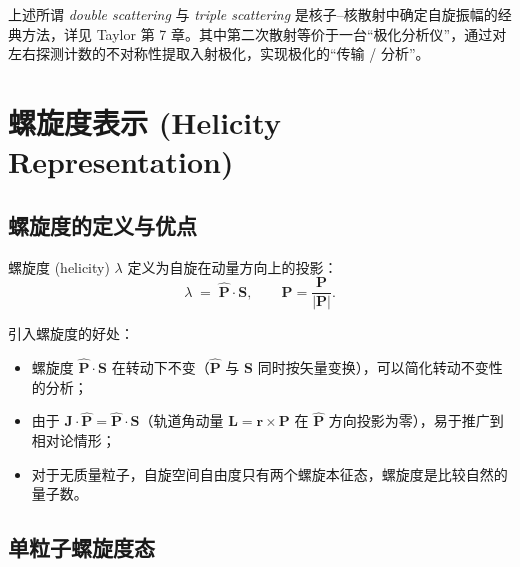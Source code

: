 \begin{remark}
上述所谓 \emph{double scattering} 与 \emph{triple scattering} 是核子–核散射中确定自旋振幅的经典方法，详见 Taylor 第 7 章。其中第二次散射等价于一台“极化分析仪”，通过对左右探测计数的不对称性提取入射极化，实现极化的“传输 / 分析”。
\end{remark}

\section{螺旋度表示 (Helicity Representation)}
\label{sec:helicity}

\subsection{螺旋度的定义与优点}

\begin{definition}[螺旋度]
\label{def:helicity}
螺旋度 (helicity) $\lambda$ 定义为自旋在动量方向上的投影：
\begin{equation}
  \lambda \;=\; \hat{\bm P}\cdot\bm S, \qquad \hat{\bm P}=\frac{\bm P}{|\bm P|}.
  \label{eq:helicity-def}
\end{equation}
\end{definition}

引入螺旋度的好处：
\begin{itemize}
  \item 螺旋度 $\hat{\bm P}\cdot\bm S$ 在转动下不变（$\hat{\bm P}$ 与 $\bm S$ 同时按矢量变换），可以简化转动不变性的分析；
  \item 由于 $\bm J\cdot\hat{\bm P}=\hat{\bm P}\cdot\bm S$（轨道角动量 $\bm L=\bm r\times \bm P$ 在 $\hat{\bm P}$ 方向投影为零），易于推广到相对论情形；
  \item 对于无质量粒子，自旋空间自由度只有两个螺旋本征态，螺旋度是比较自然的量子数。
\end{itemize}

\subsection{单粒子螺旋度态}

